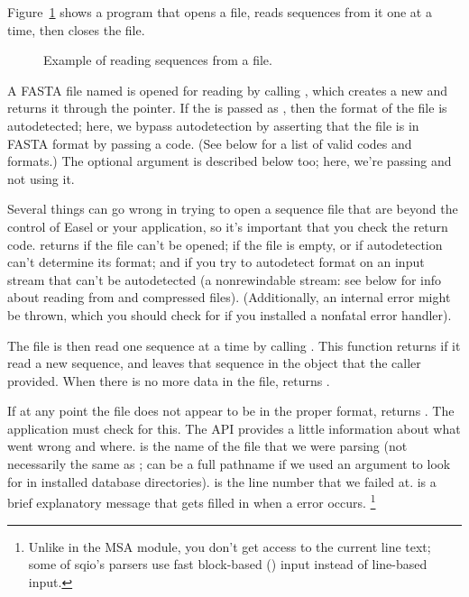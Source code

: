 Figure~\ref{fig:sqio_example} shows a program that opens a file, reads
sequences from it one at a time, then closes the file.

\begin{figure}

\caption{Example of reading sequences from a file.}
\label{fig:sqio_example}
\end{figure}

A FASTA file named  is opened for reading by calling
, which
creates a new  and returns it through the
 pointer. If the  is passed as
, then the format of the file is
autodetected; here, we bypass autodetection by asserting that the file
is in FASTA format by passing a  code. (See
below for a list of valid codes and formats.) The optional 
argument is described below too; here, we're passing  and
not using it.

Several things can go wrong in trying to open a sequence file that are
beyond the control of Easel or your application, so it's important
that you check the return code.   returns
 if the file can't be opened; 
if the file is empty, or if autodetection can't determine its format;
and  if you try to autodetect format on an input
stream that can't be autodetected (a nonrewindable stream: see below
for info about reading from  and compressed
files). (Additionally, an internal error might be thrown, which you
should check for if you installed a nonfatal error handler).

The file is then read one sequence at a time by calling
. This function returns 
if it read a new sequence, and leaves that sequence in the 
object that the caller provided.  When there is no more data in the
file,  returns . 

If at any point the file does not appear to be in the proper format,
 returns . The application
must check for this. The API provides a little information about what
went wrong and where.  is the name of the file
that we were parsing (not necessarily the same as ;
 can be a full pathname if we used an
 argument to look for  in installed database
directories).  is the line number that we
failed at.  is a brief explanatory message that
gets filled in when a  error occurs.
  \footnote{Unlike in the MSA module, you don't get access to the
  current line text; some of sqio's parsers use fast block-based
  () input instead of line-based input.}


